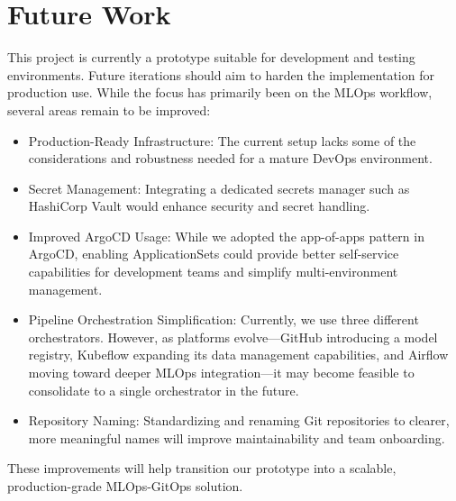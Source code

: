 \section{Future Work}\label{sec:future-work}
This project is currently a prototype suitable for development and testing environments.
Future iterations should aim to harden the implementation for production use.
While the focus has primarily been on the MLOps workflow, several areas remain to be improved:

\begin{itemize}
    \item Production-Ready Infrastructure: The current setup lacks some of the considerations and robustness needed for a mature DevOps environment.
    \item Secret Management: Integrating a dedicated secrets manager such as HashiCorp Vault would enhance security and secret handling.
    \item Improved ArgoCD Usage: While we adopted the app-of-apps pattern in ArgoCD, enabling ApplicationSets could provide better self-service capabilities for development teams and simplify multi-environment management.
    \item Pipeline Orchestration Simplification: Currently, we use three different orchestrators.
    However, as platforms evolve—GitHub introducing a model registry, Kubeflow expanding its data management capabilities, and Airflow moving toward deeper MLOps integration—it may become feasible to consolidate to a single orchestrator in the future.
    \item Repository Naming: Standardizing and renaming Git repositories to clearer, more meaningful names will improve maintainability and team onboarding.
\end{itemize}

These improvements will help transition our prototype into a scalable, production-grade MLOps-GitOps solution.
